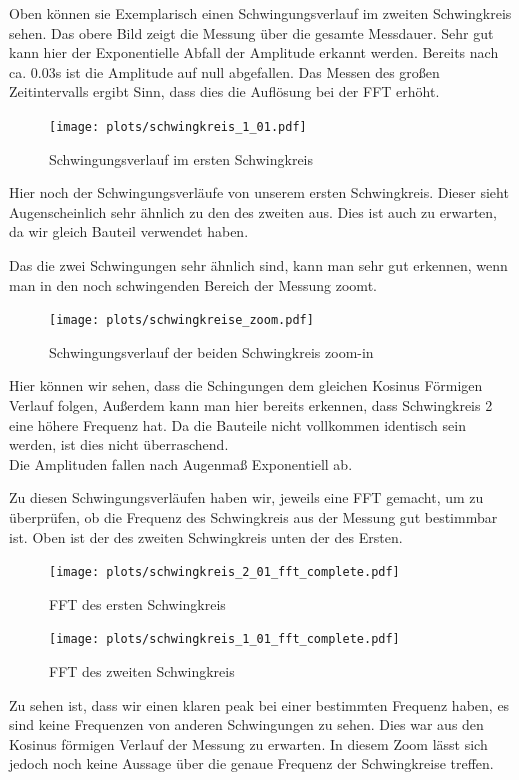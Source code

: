 \documentclass[twoside]{protokoll}
\begin{document}
Oben können sie Exemplarisch einen Schwingungsverlauf im zweiten Schwingkreis sehen. 
Das obere Bild zeigt die Messung über die gesamte Messdauer. 
Sehr gut kann hier der Exponentielle Abfall der Amplitude erkannt werden. Bereits nach ca. 0.03s ist die Amplitude auf null abgefallen. 
Das Messen des großen Zeitintervalls ergibt Sinn, dass dies die Auflösung bei der FFT erhöht.
\begin{figure}[H]
    \centering
    \texttt{[image: plots/schwingkreis\_1\_01.pdf]}
    \caption{Schwingungsverlauf im ersten Schwingkreis}
\end{figure}
Hier noch der Schwingungsverläufe von unserem ersten Schwingkreis. Dieser sieht Augenscheinlich sehr ähnlich zu den des zweiten aus.
Dies ist auch zu erwarten, da wir gleich Bauteil verwendet haben.

Das die zwei Schwingungen sehr ähnlich sind, kann man sehr gut erkennen, wenn man in den noch schwingenden Bereich der Messung zoomt.
\begin{figure}[H]
    \centering
    \texttt{[image: plots/schwingkreise\_zoom.pdf]}
    \caption{Schwingungsverlauf der beiden Schwingkreis zoom-in}
\end{figure}
Hier können wir sehen, dass die Schingungen dem gleichen Kosinus Förmigen Verlauf folgen, Außerdem kann man hier bereits erkennen, dass Schwingkreis 2 eine höhere Frequenz hat.
Da die Bauteile nicht vollkommen identisch sein werden, ist dies nicht überraschend.\\
Die Amplituden fallen nach Augenmaß Exponentiell ab.

Zu diesen Schwingungsverläufen haben wir, jeweils eine FFT gemacht, um zu überprüfen, ob die Frequenz des Schwingkreis aus der Messung gut bestimmbar ist.
Oben ist der des zweiten Schwingkreis unten der des Ersten.


\begin{figure}[H]
    \centering
    \texttt{[image: plots/schwingkreis\_2\_01\_fft\_complete.pdf]}
    \caption{FFT des ersten Schwingkreis}
\end{figure}

\begin{figure}[H]
    \centering
    \texttt{[image: plots/schwingkreis\_1\_01\_fft\_complete.pdf]}
    \caption{FFT des zweiten Schwingkreis}
\end{figure}

Zu sehen ist, dass wir einen klaren peak bei einer bestimmten Frequenz haben, es sind keine Frequenzen von anderen Schwingungen zu sehen. 
Dies war aus den Kosinus förmigen Verlauf der Messung zu erwarten. In diesem Zoom lässt sich jedoch noch keine Aussage über die genaue Frequenz der Schwingkreise treffen.
\end{document}
